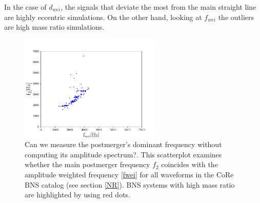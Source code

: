 \newpage
In the case of $d_{wei}$, the signals that deviate the most from the main straight line are highly eccentric simulations. On the other hand, looking at  $f_{wei}$ the outliers are high mass ratio simulations.

\begin{figure}[hbt!]
\begin{center}
\includegraphics[width=0.6\textwidth, angle=0]{images/Data_analysis/results/f2.pdf}
\captionsetup{width=0.8\textwidth}
\caption[Can we measure the postmerger's dominant frequency without computing its amplitude spectrum?]{Can we measure the postmerger's dominant frequency without computing its amplitude spectrum?. This scatterplot examines whether the main postmerger frequency $f_2$ coincides with the amplitude weighted frequency \ref{fwei} for all waveforms in the CoRe BNS catalog (see section \ref{NR}). BNS systems with high mass ratio are highlighted by using red dots.}
\label{duration measure}
\end{center}
\end{figure}

\FloatBarrier








